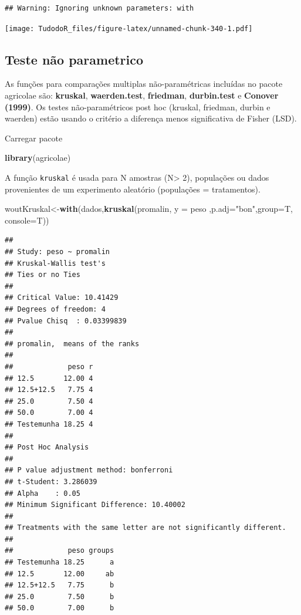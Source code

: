 \documentclass[
]{book}
\newenvironment{Shaded}{\begin{snugshade}}{\end{snugshade}}
\newcommand{\DataTypeTok}[1]{\textcolor[rgb]{0.13,0.29,0.53}{#1}}
\newcommand{\KeywordTok}[1]{\textcolor[rgb]{0.13,0.29,0.53}{\textbf{#1}}}
\newcommand{\NormalTok}[1]{#1}
\newcommand{\StringTok}[1]{\textcolor[rgb]{0.31,0.60,0.02}{#1}}
\begin{document}
\begin{verbatim}
## Warning: Ignoring unknown parameters: with
\end{verbatim}

\texttt{[image: TudodoR\_files/figure-latex/unnamed-chunk-340-1.pdf]}

\hypertarget{teste-nuxe3o-parametrico}{%
\subsection{Teste não parametrico}\label{teste-nuxe3o-parametrico}}

As funções para comparações multiplas não-paramétricas incluídas no pacote agricolae são: \textbf{kruskal}, \textbf{waerden.test}, \textbf{friedman}, \textbf{durbin.test} e \textbf{Conover (1999)}.
Os testes não-paramétricos post hoc (kruskal, friedman, durbin e waerden) estão usando o critério a diferença menos significativa de Fisher (LSD).

Carregar pacote

\begin{Shaded}
\begin{Highlighting}[]
\KeywordTok{library}\NormalTok{(agricolae)}
\end{Highlighting}
\end{Shaded}

A função \texttt{kruskal} é usada para N amostras (N\textgreater{} 2), populações ou dados provenientes de um experimento aleatório (populações = tratamentos).

\begin{Shaded}
\begin{Highlighting}[]
\NormalTok{woutKruskal<-}\KeywordTok{with}\NormalTok{(dados,}\KeywordTok{kruskal}\NormalTok{(promalin, }\DataTypeTok{y =}\NormalTok{ peso}
\NormalTok{  ,}\DataTypeTok{p.adj=}\StringTok{"bon"}\NormalTok{,}\DataTypeTok{group=}\NormalTok{T, }\DataTypeTok{console=}\NormalTok{T))}
\end{Highlighting}
\end{Shaded}

\begin{verbatim}
## 
## Study: peso ~ promalin
## Kruskal-Wallis test's
## Ties or no Ties
## 
## Critical Value: 10.41429
## Degrees of freedom: 4
## Pvalue Chisq  : 0.03399839 
## 
## promalin,  means of the ranks
## 
##             peso r
## 12.5       12.00 4
## 12.5+12.5   7.75 4
## 25.0        7.50 4
## 50.0        7.00 4
## Testemunha 18.25 4
## 
## Post Hoc Analysis
## 
## P value adjustment method: bonferroni
## t-Student: 3.286039
## Alpha    : 0.05
## Minimum Significant Difference: 10.40002 
## 
## Treatments with the same letter are not significantly different.
## 
##             peso groups
## Testemunha 18.25      a
## 12.5       12.00     ab
## 12.5+12.5   7.75      b
## 25.0        7.50      b
## 50.0        7.00      b
\end{verbatim}
\end{document}
